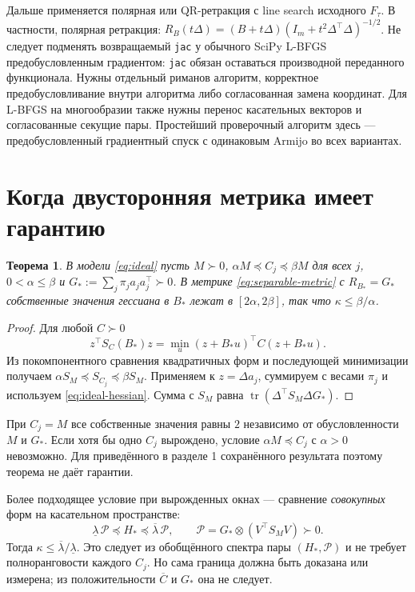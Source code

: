 \documentclass[11pt,a4paper]{article}
\newcommand{\tr}{\operatorname{tr}}
\newcommand{\code}[1]{\nolinkurl{#1}}
\newtheorem{theorem}{Теорема}[section]
\theoremstyle{remark}
\begin{document}
Дальше применяется полярная или QR-ретракция с line search исходного
$F_\tau$. В частности, полярная ретракция:
$R_B(t\Delta)=(B+t\Delta)(I_m+t^2\Delta^\top\Delta)^{-1/2}$.
Не следует подменять возвращаемый \code{jac} у обычного SciPy L-BFGS
предобусловленным градиентом: \code{jac} обязан оставаться производной
переданного функционала. Нужны отдельный риманов алгоритм, корректное
предобусловливание внутри алгоритма либо согласованная замена координат.
Для L-BFGS на многообразии также нужны перенос касательных векторов
и согласованные секущие пары. Простейший проверочный алгоритм здесь ---
предобусловленный градиентный спуск с одинаковым Armijo во всех вариантах.

\section{Когда двусторонняя метрика имеет гарантию}

\begin{theorem}\label{th:separable}
В модели \eqref{eq:ideal} пусть $M\succ0$,
$\alpha M\preceq C_j\preceq\beta M$ для всех $j$,
$0<\alpha\le\beta$ и $G_*:=\sum_j\pi_ja_ja_j^\top\succ0$.
В метрике \eqref{eq:separable-metric} с $R_{B_*}=G_*$ собственные
значения гессиана в $B_*$ лежат в $[2\alpha,2\beta]$,
так что $\kappa\le\beta/\alpha$.
\end{theorem}
\begin{proof}
Для любой $C\succ0$
\[
 z^\top S_C(B_*)z=\min_u(z+B_*u)^\top C(z+B_*u).
\]
Из покомпонентного сравнения квадратичных форм и последующей
минимизации получаем
$\alpha S_M\preceq S_{C_j}\preceq\beta S_M$.
Применяем к $z=\Delta a_j$, суммируем с весами $\pi_j$ и используем
\eqref{eq:ideal-hessian}. Сумма с $S_M$ равна
$\tr(\Delta^\top S_M\Delta G_*)$.
\end{proof}

При $C_j=M$ все собственные значения равны $2$ независимо от
обусловленности $M$ и $G_*$. Если хотя бы одно $C_j$ вырождено,
условие $\alpha M\preceq C_j$ с $\alpha>0$ невозможно. Для приведённого
в разделе 1 сохранённого результата поэтому теорема не даёт гарантии.

Более подходящее условие при вырожденных окнах --- сравнение
\emph{совокупных} форм на касательном пространстве:
\begin{equation}\label{eq:aggregate-bound}
 \underline\lambda\,\mathcal P\preceq H_*\preceq
 \overline\lambda\,\mathcal P,\qquad
 \mathcal P=G_*\otimes(V^\top S_MV)\succ0.
\end{equation}
Тогда $\kappa\le\overline\lambda/\underline\lambda$.
Это следует из обобщённого спектра пары $(H_*,\mathcal P)$ и не требует
полноранговости каждого $C_j$. Но сама граница должна быть доказана
или измерена; из положительности $\overline C$ и $G_*$ она не следует.
\end{document}

